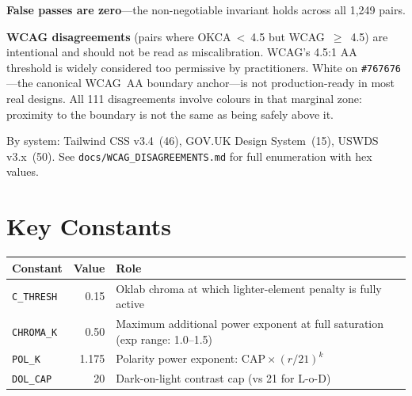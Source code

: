 \documentclass[11pt,a4paper]{article}
\begin{document}
\textbf{False passes are zero}---the non-negotiable invariant holds
across all 1,249 pairs.

\textbf{WCAG disagreements} (pairs where OKCA~<~4.5 but
WCAG~$\ge$~4.5) are intentional and should not be read as
miscalibration.  WCAG's 4.5:1 AA threshold is widely considered too
permissive by practitioners.  White on \texttt{\#767676}---the canonical
WCAG~AA boundary anchor---is not production-ready in most real designs.
All 111 disagreements involve colours in that marginal zone: proximity
to the boundary is not the same as being safely above it.

By system: Tailwind CSS v3.4~(46), GOV.UK Design System~(15),
USWDS v3.x~(50).  See \texttt{docs/WCAG\_DISAGREEMENTS.md}
for full enumeration with hex values.

\section{Key Constants}

\begin{table}[h]
\centering
\begin{tabular}{@{}lrl@{}}
\toprule
\textbf{Constant} & \textbf{Value} & \textbf{Role} \\
\midrule
\texttt{C\_THRESH} & 0.15  & Oklab chroma at which lighter-element penalty is fully active \\
\texttt{CHROMA\_K} & 0.50  & Maximum additional power exponent at full saturation (exp range: 1.0--1.5) \\
\texttt{POL\_K}    & 1.175 & Polarity power exponent: $\text{CAP}\times(r/21)^k$ \\
\texttt{DOL\_CAP}  & 20    & Dark-on-light contrast cap (vs 21 for L-o-D) \\
\bottomrule
\end{tabular}
\end{table}
\end{document}
